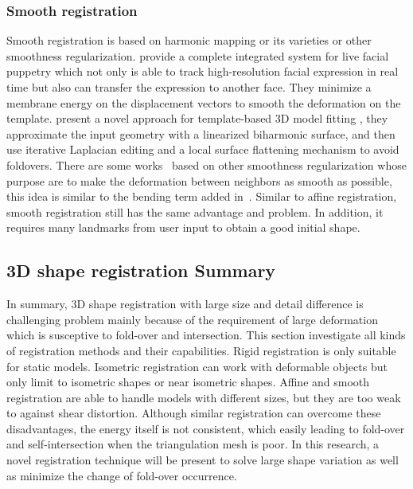 \subsubsection{Smooth registration}
Smooth registration is based on harmonic mapping or its varieties or other smoothness regularization. \cite{weise2009face} provide a complete integrated system for live facial puppetry which not only is able to track high-resolution facial expression in real time but also can transfer the expression to another face. They minimize a membrane energy on the displacement vectors to smooth the deformation on the template. \cite{yeh2011template} present a novel approach for template-based 3D model fitting , they approximate the input geometry with a linearized biharmonic surface, and then use iterative Laplacian editing and a local surface flattening mechanism to avoid foldovers. There are some works~\citep{allen2003space,amberg2007optimal} based on other smoothness regularization whose purpose are to make the deformation between neighbors as smooth as possible, this idea is similar to the bending term added in~\cite{levi2015smooth}. Similar to affine registration, smooth registration still has the same advantage and problem. In addition, it requires many landmarks from user input to obtain a good initial shape.

\subsection{3D shape registration Summary}
In summary, 3D shape registration with large size and detail difference is challenging problem mainly because of the requirement of large deformation which is susceptive to fold-over and intersection. This section investigate all kinds of registration methods and their capabilities. Rigid registration is only suitable for static models. Isometric registration can work with deformable objects but only limit to isometric shapes or near isometric shapes. Affine and smooth registration are able to handle models with different sizes, but they are too weak to against shear distortion. Although similar registration can overcome these disadvantages, the energy itself is not consistent, which easily leading to fold-over and self-intersection when the triangulation mesh is poor. In this research, a novel registration technique will be present to solve large shape variation as well as minimize the change of fold-over occurrence.

\ifx\isEmbedded\undefined
\pagebreak

\fi
